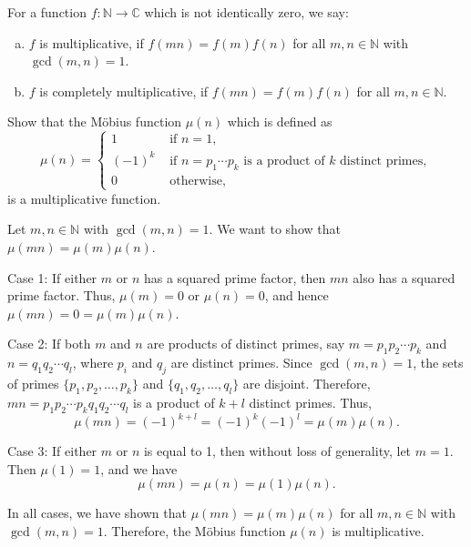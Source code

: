 \documentclass{elegantbook}
\begin{document}
\begin{definition}
  For a function $f:\mathbb{N} \to \mathbb{C}$ which is not identically zero, we say:
  \begin{enumerate}[(a)]
    \item $f$ is multiplicative, if $f(mn)=f(m)f(n)$ for all $m,n\in\mathbb{N}$ with $\gcd(m,n)=1$.
    \item $f$ is completely multiplicative, if $f(mn)=f(m)f(n)$ for all $m,n\in\mathbb{N}$.
  \end{enumerate}
\end{definition}

\begin{exercise}
  Show that the Möbius function $\mu(n)$ which is defined as
  \[
    \mu(n) = \begin{cases}
      1 & \text{ if } n=1, \\
      (-1)^k & \text{ if } n=p_1\cdots p_k \text{ is a product of } k \text{ distinct primes}, \\
      0 & \text{ otherwise},
    \end{cases}
  \]
  is a multiplicative function.
\end{exercise}

\begin{solution}
  Let $m,n\in\mathbb{N}$ with $\gcd(m,n)=1$. We want to show that $\mu(mn) = \mu(m) \mu(n)$.

  Case 1: If either $m$ or $n$ has a squared prime factor, then $mn$ also has a squared prime factor. Thus, $\mu(m) = 0$ or $\mu(n) = 0$, and hence $\mu(mn) = 0 = \mu(m) \mu(n)$.

  Case 2: If both $m$ and $n$ are products of distinct primes, say $m = p_1 p_2 \cdots p_k$ and $n = q_1 q_2 \cdots q_l$, where $p_i$ and $q_j$ are distinct primes. Since $\gcd(m,n)=1$, the sets of primes $\{p_1, p_2, \ldots, p_k\}$ and $\{q_1, q_2, \ldots, q_l\}$ are disjoint. Therefore, $mn = p_1 p_2 \cdots p_k q_1 q_2 \cdots q_l$ is a product of $k+l$ distinct primes. Thus,
  \[
    \mu(mn) = (-1)^{k+l} = (-1)^k (-1)^l = \mu(m) \mu(n).
  \]

  Case 3: If either $m$ or $n$ is equal to 1, then without loss of generality, let $m=1$. Then $\mu(1) = 1$, and we have
  \[
    \mu(mn) = \mu(n) = \mu(1) \mu(n).
  \]

  In all cases, we have shown that $\mu(mn) = \mu(m) \mu(n)$ for all $m,n\in\mathbb{N}$ with $\gcd(m,n)=1$. Therefore, the Möbius function $\mu(n)$ is multiplicative.
\end{solution}
\end{document}
